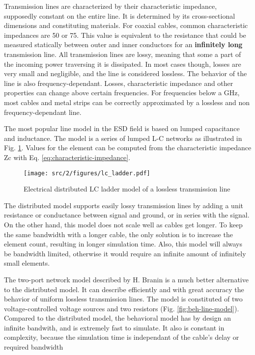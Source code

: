 Transmission lines are characterized by their characteristic impedance, supposedly constant on the entire line.
It is determined by its cross-sectional dimensions and constituting materials.
For coaxial cables, common characteristic impedances are 50\textOmega{} or 75\textOmega{}.
This value is equivalent to the resistance that could be measured statically between outer and inner conductors for an \textbf{infinitely long} transmission line.
All transmission lines are lossy, meaning that some a part of the incoming power traversing it is dissipated.
In most cases though, losses are very small and negligible, and the line is considered lossless.
The behavior of the line is also frequency-dependant.
Losses, characteristic impedance and other properties can change above certain frequencies.
For frequencies below a GHz, most cables and metal strips can be correctly approximated by a lossless and non frequency-dependant line.

The most popular line model in the ESD field is based on lumped capacitance and inductance.
The model is a series of lumped L-C networks as illustrated in Fig. \ref{fig:dis-line-model}.
Values for the element can be computed from the characteristic impedance \gls{Zc} with Eq. \ref{eq:characteristic-impedance}.

\begin{figure}[!h]
  \centering
  \texttt{[image: src/2/figures/lc\_ladder.pdf]}
  \caption{Electrical distributed LC ladder model of a lossless transmission line}
  \label{fig:dis-line-model}
\end{figure}

The distributed model supports easily lossy transmission lines by adding a unit resistance or conductance between signal and ground, or in series with the signal.
On the other hand, this model does not scale well as cables get longer.
To keep the same bandwidth with a longer cable, the only solution is to increase the element count, resulting in longer simulation time.
Also, this model will always be bandwidth limited, otherwise it would require an infinite amount of infinitely small elements.


The two-port network model described by H. Branin \cite{branin-tl-ref} is a much better alternative to the distributed model.
It can describe efficiently and with great accuracy the behavior of uniform lossless transmission lines.
The model is constituted of two voltage-controlled voltage sources and two resistors (Fig. \ref{fig:beh-line-model}).
Compared to the distributed model, the behavioral model has by design an infinite bandwith, and is extremely fast to simulate.
It also is constant in complexity, because the simulation time is independant of the cable's delay or required bandwidth

